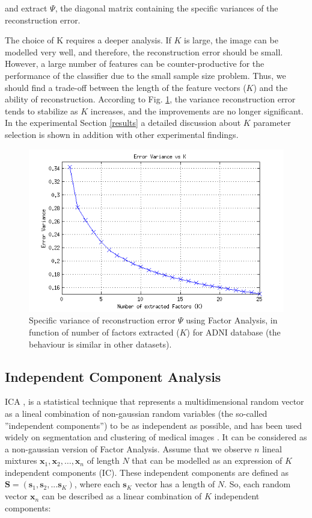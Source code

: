 \noindent and extract $\Psi$, the diagonal matrix containing the specific variances of the reconstruction error.

The choice of K requires a deeper analysis. If $K$ is large, the image can be modelled very well, and therefore, the reconstruction error should be small. However, a large number of features can be counter-productive for the performance of the classifier due to the small sample size problem. Thus, we should find a trade-off between the length of the feature vectors ($K$) and the ability of reconstruction. According to Fig. \ref{fig:error}, the variance reconstruction error tends to stabilize as $K$ increases, and the improvements are no longer significant. In the experimental Section \ref{results} a detailed discussion about $K$ parameter selection is shown in addition with other experimental findings.

\begin{figure}[ht]
	\centering
	\includegraphics[width=0.45\linewidth]{Graphics/ch4/varError-K-ADNI}
	\caption{Specific variance of reconstruction error $\Psi$ using Factor Analysis, in function of number of factors extracted ($K$) for ADNI database (the behaviour is similar in other datasets).}
	\label{fig:error}
\end{figure}

\subsection{Independent Component Analysis}
\cite{Martinez-Murcia2013255,Martinez-Murcia201458}

\acf{ICA} \cite{Hyvarinen2000}, is a statistical technique that represents a multidimensional random vector as a lineal combination of non-gaussian random variables (the so-called ''independent components'') to be as independent as possible, and has been used widely on segmentation and clustering of medical images \cite{DeMartino2007,Alvarez2009}. It can be considered as a non-gaussian version of Factor Analysis. Assume that we observe $n$ lineal mixtures $\mathbf{x}_1, \mathbf{x}_2, \ldots, \mathbf{x}_n$ of length $N$ that can be modelled as an expression of $K$ independent components (IC). These independent components are defined as $\mathbf{S} = (\mathbf{s}_1, \mathbf{s}_2, ... \mathbf{s}_K)$, where each $\mathbf{s}_K$ vector has a length of $N$. So, each random vector $\mathbf{x}_n$ can be described as a linear combination of $K$ independent components: 

